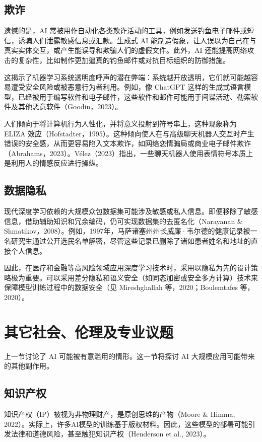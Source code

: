 \documentclass[lang=cn,newtx,10pt,scheme=chinese]{elegantbook}
\begin{document}
\subsection{欺诈}
遗憾的是，AI 常被用作自动化各类欺诈活动的工具，例如发送钓鱼电子邮件或短信，诱骗人们泄露敏感信息或汇款。生成式 AI 能制造假象，让人误以为自己在与真实实体交互，或产生能误导和欺骗人们的虚假文件。此外，AI 还能提高网络攻击的复杂性，比如制作更加逼真的钓鱼邮件或对抗目标组织的防御措施。

这揭示了机器学习系统透明度呼声的潜在弊端：系统越开放透明，它们就可能越容易遭受安全风险或被恶意行为者利用。例如，像 ChatGPT 这样的生成式语言模型，已经被用于编写软件和电子邮件，这些软件和邮件可能用于间谍活动、勒索软件及其他恶意软件（Goodin，2023）。

人们倾向于将计算机行为人性化，并将意义投射到符号串上，这种现象称为 ELIZA 效应（Hofstadter，1995）。这种倾向使人在与高级聊天机器人交互时产生错误的安全感，从而更容易陷入文本欺诈，如网络恋情骗局或商业电子邮件欺诈（Abrahams，2023）。Vélez（2023）指出，一些聊天机器人使用表情符号本质上是利用人的情感反应进行操纵。

\subsection{数据隐私}
现代深度学习依赖的大规模众包数据集可能涉及敏感或私人信息。即便移除了敏感信息，借助辅助知识和冗余编码，仍可实现数据集的去匿名化（Narayanan \& Shmatikov，2008）。例如，1997年，马萨诸塞州州长威廉·韦尔德的健康记录被一名研究生通过公开选民名单解密，尽管这些记录已删除了诸如患者姓名和地址的直接个人信息。

因此，在医疗和金融等高风险领域应用深度学习技术时，采用以隐私为先的设计策略极为重要。可以采用差分隐私和语义安全（如同态加密或安全多方计算）技术来保障模型训练过程中的数据安全（见 Mireshghallah 等，2020；Boulemtafes 等，2020）。

\section{其它社会、伦理及专业议题}
上一节讨论了 AI 可能被有意滥用的情形。这一节将探讨 AI 大规模应用可能带来的其他副作用。

\subsection{知识产权}
知识产权（IP）被视为非物理财产，是原创思维的产物（Moore \& Himma, 2022）。实际上，许多AI模型的训练基于版权材料。因此，这些模型的部署可能引发法律和道德风险，甚至触犯知识产权（Henderson et al., 2023）。
\end{document}
